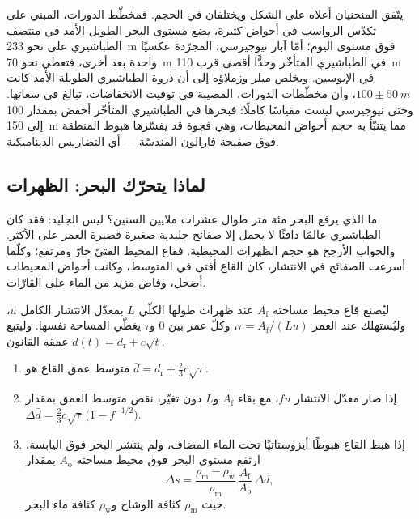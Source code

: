 يتّفق المنحنيان أعلاه على الشكل ويختلفان في الحجم. فمخطّط الدورات، المبني على
تكدّس الرواسب في أحواض كثيرة، يضع مستوى البحر الطويل الأمد في منتصف الطباشيري
على نحو \qty{233}{m} فوق مستوى اليوم؛ أمّا آبار نيوجيرسي، المجرّدة عكسيًا واحدة بعد أخرى، فتعطي نحو
\qty{70}{m} في الطباشيري المتأخّر وحدًّا أقصى قرب \qty{110}{m} في الإيوسين. ويخلص ميلر
وزملاؤه إلى أن ذروة الطباشيري الطويلة الأمد كانت $100 \pm \qty{50}{m}$، وأن
مخطّطات الدورات، المصيبة في توقيت الانخفاضات، تبالغ في سعاتها. وحتى نيوجيرسي
ليست مقياسًا كاملًا: فبحرها في الطباشيري المتأخّر أخفض بمقدار 100 إلى \qty{150}{m} مما يتنبّأ به حجم
أحواض المحيطات، وهي فجوة قد يفسّرها هبوط المنطقة فوق صفيحة فارالون
المندسّة --- أي التضاريس الديناميكية.

\subsection*{لماذا يتحرّك البحر: الظهرات}

ما الذي يرفع البحر مئة متر طوال عشرات ملايين السنين؟ ليس الجليد: فقد كان الطباشيري
عالمًا دافئًا لا يحمل إلا صفائح جليدية صغيرة قصيرة العمر على الأكثر. والجواب الأرجح هو حجم
الظهرات المحيطية. فقاع المحيط الفتيّ حارّ ومرتفع؛ وكلّما أسرعت الصفائح في الانتشار، كان
القاع أفتى في المتوسط، وكانت أحواض المحيطات أضحل، وفاض مزيد من الماء على
القارّات.

\begin{proposition}\label{prop:b2:phanerozoic-earth:ridge}
ليُصنع قاع محيط مساحته $A_{\text{f}}$ عند ظهرات طولها الكلّي $L$ بمعدّل الانتشار
الكامل $u$، وليُستهلك عند العمر $\tau = A_{\text{f}}/(Lu)$، وكلّ عمر بين 0
و$\tau$ يغطّي المساحة نفسها. وليتبع عمقه القانون $d(t) = d_{\text{r}} + c\sqrt t$.
\begin{enumerate}
  \item متوسط عمق القاع هو $\bar d = d_{\text{r}} + \tfrac23 c\sqrt\tau$.
  \item إذا صار معدّل الانتشار $fu$، مع بقاء $A_{\text{f}}$ و$L$ دون تغيّر، نقص متوسط
        العمق بمقدار $\Delta\bar d = \tfrac23 c\sqrt\tau\,\bigl(1 - f^{-1/2}\bigr)$.
  \item إذا هبط القاع هبوطًا أيزوستاتيًا تحت الماء المضاف، ولم ينتشر البحر
        فوق اليابسة، ارتفع مستوى البحر فوق محيط مساحته $A_{\text{o}}$ بمقدار
        \[
        \Delta s = \frac{\rho_{\text{m}} - \rho_{\text{w}}}{\rho_{\text{m}}}\,
        \frac{A_{\text{f}}}{A_{\text{o}}}\,\Delta\bar d ,
        \]
        حيث $\rho_{\text{m}}$ كثافة الوشاح و$\rho_{\text{w}}$ كثافة ماء البحر.
\end{enumerate}
\end{proposition}

